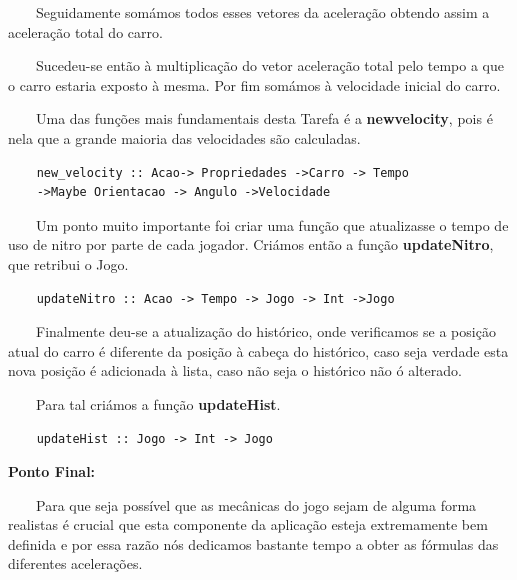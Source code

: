 \documentclass[a4paper]{report} %
\begin{document}
            \par \ \ \ \ Seguidamente somámos todos esses vetores da aceleração obtendo assim a aceleração total do carro. 
            \par \ \ \ \ Sucedeu-se então à multiplicação do vetor aceleração total pelo tempo a que o carro estaria exposto à mesma.  Por fim somámos à velocidade inicial do carro. 
            \par \ \ \ \ Uma das funções mais fundamentais desta Tarefa é a \textbf{newvelocity}, pois é nela que a grande maioria das velocidades são calculadas.  
                            \begin{verbatim}
    new_velocity :: Acao-> Propriedades ->Carro -> Tempo
    ->Maybe Orientacao -> Angulo ->Velocidade
                            \end{verbatim}        
            \par \ \ \ \ Um ponto muito importante foi criar uma função que atualizasse o tempo de uso de nitro por parte de cada jogador. Criámos então a função \textbf{updateNitro}, que retribui o Jogo.     
                            \begin{verbatim}
    updateNitro :: Acao -> Tempo -> Jogo -> Int ->Jogo                            
                            \end{verbatim}
            \par \ \ \ \  Finalmente deu-se a atualização do histórico, onde verificamos se a posição atual do carro é diferente da posição à cabeça do histórico, caso seja verdade esta nova posição é adicionada à lista, caso não seja o histórico não ó alterado.
            \par \ \ \ \  Para tal criámos a função \textbf{updateHist}.
                            \begin{verbatim}
    updateHist :: Jogo -> Int -> Jogo                            
                            \end{verbatim}  
           \vspace{5mm}
           \par \textbf{ Ponto Final:} 
           \par \ \ \ \ Para que seja possível que as mecânicas do jogo sejam de alguma forma realistas é crucial que esta componente da aplicação esteja extremamente bem definida e por essa razão nós dedicamos bastante tempo a obter as fórmulas das diferentes acelerações.
           
           \vspace{10mm}
           
\end{document}

